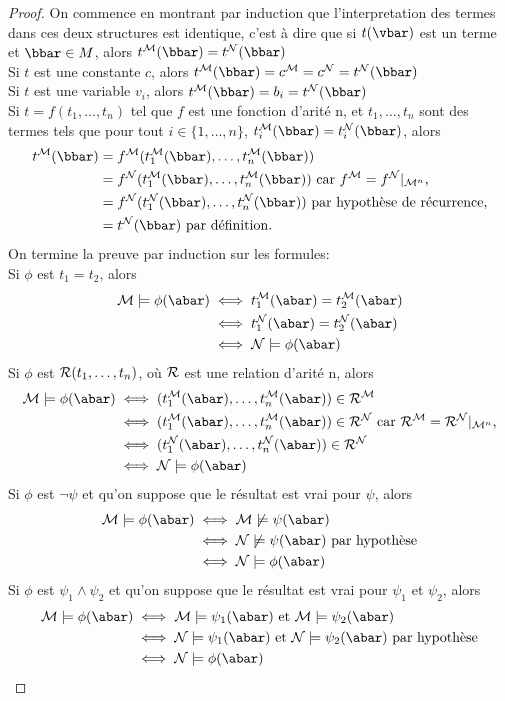 \begin{proof}
On commence en montrant par induction que l'interpretation des termes dans ces deux structures est identique,
c'est à dire que si $t(\vbar)$ est un terme et $\bbar \in M$, alors $t^{\cM}(\bbar) = t^{\cN}(\bbar)$\\
Si $t$ est une constante $c$, alors  $t^{\cM}(\bbar) = c^{\cM} = c^{\cN} = t^{\cN}(\bbar)$\\
Si $t$ est une variable $v_i$, alors $t^{\cM}(\bbar) = b_i = t^{\cN}(\bbar)$\\
Si $t = f(t_1,\dots,t_n)$ tel que $f$ est une fonction d'arité n, et $t_1,\dots,t_n$ sont des termes tels que pour tout $i \in \{ 1,\dots,n \}$,
$t^{\cM}_i(\bbar) = t^{\cN}_i(\bbar)$, alors
\begin{align*}
t^{\cM}(\bbar) &= f^{\cM}(t^{\cM}_1(\bbar),\dots,t^{\cM}_n(\bbar))\\
&= f^{\cN}(t^{\cM}_1(\bbar),\dots,t^{\cM}_n(\bbar)) \text{ car $f^{\cM} = f^{\cN} \vert_{\cM^n}$,}\\
&= f^{\cN}(t^{\cN}_1(\bbar),\dots,t^{\cN}_n(\bbar)) \text{ par hypothèse de récurrence,}\\
&= t^{\cN}(\bbar) \text{ par définition.}
\end{align*}
On termine la preuve par induction sur les formules:\\
Si $\phi$ est $t_1 = t_2$, alors
\begin{align*}
\cM \models \phi(\abar) &\iff t^{\cM}_1(\abar) = t^{\cM}_2(\abar)\\
&\iff t^{\cN}_1(\abar) = t^{\cN}_2(\abar)\\
&\iff \cN \models \phi(\abar)
\end{align*}
Si $\phi$ est $\mathcal{R}(t_1,\dots,t_n)$, où $\mathcal{R}$ est une relation d'arité n, alors
\begin{align*}
\cM \models \phi(\abar) &\iff (t^{\cM}_1(\abar),\dots,t^{\cM}_n(\abar)) \in \cR^{\cM}\\
&\iff (t^{\cM}_1(\abar),\dots,t^{\cM}_n(\abar)) \in \cR^{\cN} \text{ car $\cR^{\cM} = \cR^{\cN} \vert_{\cM^n}$,}\\
&\iff (t^{\cN}_1(\abar),\dots,t^{\cN}_n(\abar)) \in \cR^{\cN}\\
&\iff \cN \models \phi(\abar)
\end{align*}
Si $\phi$ est $\neg\psi$ et qu'on suppose que le résultat est vrai pour $\psi$, alors
\begin{align*}
\cM \models \phi(\abar) &\iff \cM \not\models \psi(\abar)\\
&\iff \cN \not\models \psi(\abar) \text{ par hypothèse}\\
&\iff \cN \models \phi(\abar)
\end{align*}
Si $\phi$ est $\psi_1 \wedge \psi_2$ et qu'on suppose que le résultat est vrai pour $\psi_1$ et $\psi_2$, alors
\begin{align*}
\cM \models \phi(\abar) &\iff \cM \models \psi_1(\abar) \text{ et } \cM \models \psi_2(\abar)\\
&\iff \cN \models \psi_1(\abar) \text{ et } \cN \models \psi_2(\abar) \text{ par hypothèse}\\
&\iff \cN \models \phi(\abar)
\end{align*}


\end{proof}
